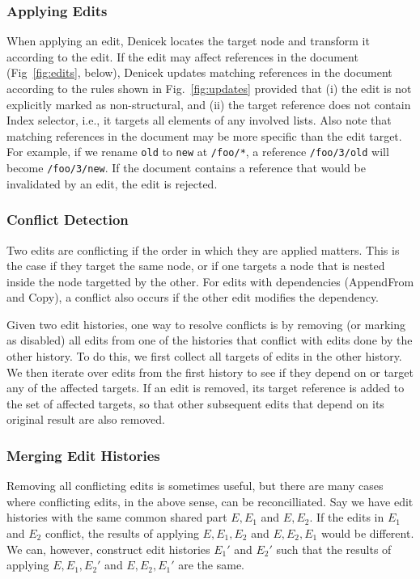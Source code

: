 \documentclass[sigconf,anonymous,screen]{acmart}
\newcommand{\ident}[1]{{\sffamily #1}}
\begin{document}
\subsubsection*{Applying Edits}
When applying an edit, Denicek locates the target node and transform it according to the
edit. If the edit may affect references in the document (Fig~\ref{fig:edits}, below), Denicek
updates matching references in the document according to the rules shown in Fig.~\ref{fig:updates}
provided that (i) the edit is not explicitly marked as non-structural, and (ii) the target
reference does not contain \ident{Index} selector, i.e., it targets all elements of any involved
lists. Also note that matching references in the document may be more specific than the edit
target. For example, if we rename {\small\Verb|old|} to {\small\Verb|new|} at {\small\Verb|/foo/*|},
a reference {\small\Verb|/foo/3/old|} will become {\small\Verb|/foo/3/new|}. If the document
contains a reference that would be invalidated by an edit, the edit is rejected.

\subsubsection*{Conflict Detection}
Two edits are conflicting if the order in which they are applied matters. This is the case if
they target the same node, or if one targets a node that is nested inside the node targetted by
the other. For edits with dependencies (\ident{AppendFrom} and \ident{Copy}), a conflict also
occurs if the other edit modifies the dependency.

Given two edit histories, one way to resolve conflicts is by removing (or marking as disabled) all
edits from one of the histories that conflict with edits done by the other history. To do this,
we first collect all targets of edits in the other history. We then iterate over edits from the first
history to see if they depend on or target any of the affected targets. If an edit is removed,
its target reference is added to the set of affected targets, so that other subsequent edits that depend
on its original result are also removed.

\subsubsection*{Merging Edit Histories}
Removing all conflicting edits is sometimes useful, but there are many cases where conflicting
edits, in the above sense, can be reconcilliated. Say we have edit histories with
the same common shared part $E, E_1$ and $E, E_2$. If the edits in $E_1$ and $E_2$ conflict,
the results of applying $E, E_1, E_2$ and $E, E_2, E_1$ would be different. We can, however,
construct edit histories $E_1'$ and $E_2'$ such that the results of applying $E, E_1, E_2'$ and
$E, E_2, E_1'$ are the same.
\end{document}
